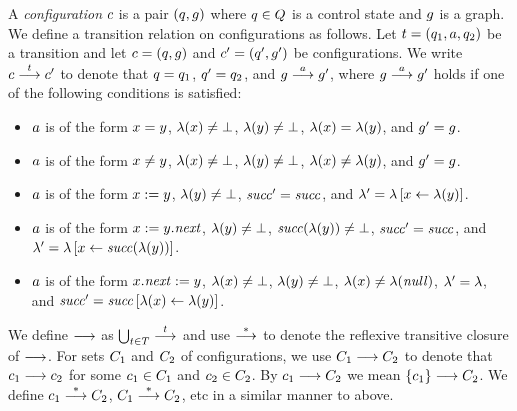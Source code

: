 A {\it configuration} $c$ is a pair $\left(q,g\right)$ where
$q\in Q$ is a control state and $g$ is a graph.
%
We define a transition relation on configurations as follows.
%
Let $t=\left(q_1,a,q_2\right)$ be a transition and let
$c=\left(q,g\right)$ and $c'=\left(q',g'\right)$ be configurations.
%
We write $c\stackrel{t}{\longrightarrow}c'$ to denote that 
$q=q_1$, $q'=q_2$, and $g\stackrel{a}{\longrightarrow}g'$,
where
$g\stackrel{a}{\longrightarrow}g'$ holds
if one of the following conditions is satisfied:
\begin{itemize}
\item
$a$ is of the form $x=y$,
$\lambda(x)\neq\bot$,
$\lambda(y)\neq\bot$,
$\lambda(x)=\lambda(y)$, and
$g'=g$.
\item
$a$ is of the form $x\neq y$,
$\lambda(x)\neq\bot$,
$\lambda(y)\neq\bot$,
$\lambda(x)\neq\lambda(y)$, and
$g'=g$.
\item
$a$ is of the form $x:=y$, 
$\lambda(y)\neq\bot$,
${\it succ}'={\it succ}$,
and $\lambda'=\lambda\left[x\leftarrow\lambda(y)\right]$.
\item %
$a$ is of the form $x:=y.{\it next}$,
$\lambda(y)\neq\bot$,
${\it succ}(\lambda(y))\neq\bot$,
${\it succ}'={\it succ}$, and
$\lambda'=\lambda\left[x\leftarrow{\it succ}(\lambda(y))\right]$.
\item %
$a$ is of the form $x.{\it next}:=y$,
$\lambda(x)\neq\bot$,
$\lambda(y)\neq\bot$,
$\lambda(x)\neq\lambda({\it null})$,
$\lambda'=\lambda$, and
${\it succ}'={\it succ}\left[\lambda(x)\leftarrow\lambda(y)\right]$.
\end{itemize}
%
We define $\stackrel{}{\longrightarrow}$ as $\bigcup_{t\in T}\stackrel{t}{\longrightarrow}$ and 
use $\stackrel{*}{\longrightarrow}$ to denote the reflexive transitive closure of $\stackrel{}{\longrightarrow}$.
%
For sets $C_1$ and $C_2$ of configurations, 
we use $C_1\stackrel{}{\longrightarrow}C_2$ to denote that
$c_1\stackrel{}{\longrightarrow}c_2$ for some $c_1\in C_1$ and $c_2\in C_2$.
%
By  $c_1\stackrel{}{\longrightarrow}C_2$ we mean 
$\left\{c_1\right\}\stackrel{}{\longrightarrow}C_2$.
%
We define $c_1\stackrel{*}{\longrightarrow}C_2$, $C_1\stackrel{*}{\longrightarrow}C_2$, etc in a similar manner to above.

